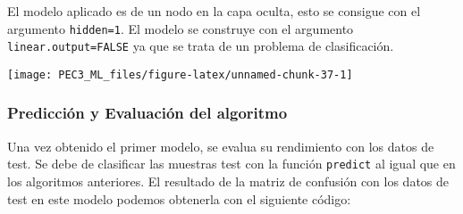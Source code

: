 \documentclass[
]{article}
\newenvironment{Shaded}{\begin{snugshade}}{\end{snugshade}}
\newcommand{\CommentTok}[1]{\textcolor[rgb]{0.56,0.35,0.01}{\textit{#1}}}
\newcommand{\DataTypeTok}[1]{\textcolor[rgb]{0.13,0.29,0.53}{#1}}
\newcommand{\DecValTok}[1]{\textcolor[rgb]{0.00,0.00,0.81}{#1}}
\newcommand{\FloatTok}[1]{\textcolor[rgb]{0.00,0.00,0.81}{#1}}
\newcommand{\KeywordTok}[1]{\textcolor[rgb]{0.13,0.29,0.53}{\textbf{#1}}}
\newcommand{\NormalTok}[1]{#1}
\newcommand{\OperatorTok}[1]{\textcolor[rgb]{0.81,0.36,0.00}{\textbf{#1}}}
\newcommand{\OtherTok}[1]{\textcolor[rgb]{0.56,0.35,0.01}{#1}}
\newcommand{\StringTok}[1]{\textcolor[rgb]{0.31,0.60,0.02}{#1}}
\begin{document}
El modelo aplicado es de un nodo en la capa oculta, esto se consigue con
el argumento \texttt{hidden=1}. El modelo se construye con el argumento
\texttt{linear.output=FALSE} ya que se trata de un problema de
clasificación.

\begin{Shaded}
\end{Shaded}

\begin{center}\texttt{[image: PEC3\_ML\_files/figure-latex/unnamed-chunk-37-1]} \end{center}

\hypertarget{predicciuxf3n-y-evaluaciuxf3n-del-algoritmo-2}{%
\subsubsection{Predicción y Evaluación del
algoritmo}\label{predicciuxf3n-y-evaluaciuxf3n-del-algoritmo-2}}

Una vez obtenido el primer modelo, se evalua su rendimiento con los
datos de test. Se debe de clasificar las muestras test con la función
\texttt{predict} al igual que en los algoritmos anteriores. El resultado
de la matriz de confusión con los datos de test en este modelo podemos
obtenerla con el siguiente código:
\end{document}
